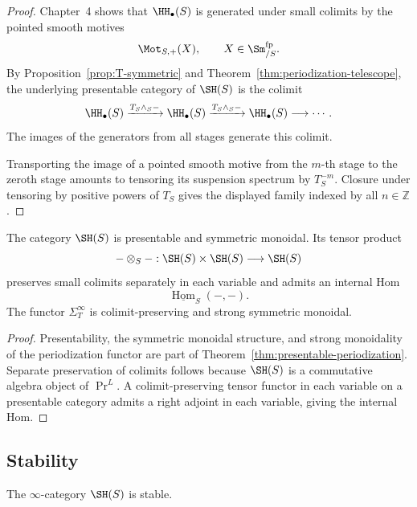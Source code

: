 \begin{proof}
Chapter~4 shows that \(\HH_\bullet(S)\) is generated under small colimits by
the pointed smooth motives
\[
    \Mot_{S,+}(X),
    \qquad
    X\in\Sm^{\mathrm{fp}}_{/S}.
\]
By Proposition~\ref{prop:T-symmetric} and
Theorem~\ref{thm:periodization-telescope}, the underlying presentable category
of \(\SH(S)\) is the colimit
\[
    \HH_\bullet(S)
    \xrightarrow{T_S\wedge_S-}
    \HH_\bullet(S)
    \xrightarrow{T_S\wedge_S-}
    \HH_\bullet(S)
    \longrightarrow\cdots.
\]
The images of the generators from all stages generate this colimit.

Transporting the image of a pointed smooth motive from the \(m\)-th stage to
the zeroth stage amounts to tensoring its suspension spectrum by
\(T_S^{-m}\).  Closure under tensoring by positive powers of \(T_S\) gives
the displayed family indexed by all \(n\in\mathbb Z\).
\end{proof}

\begin{proposition}
\label{prop:SH-presentable-closed}
The category $\SH(S)$ is presentable and symmetric monoidal.  Its tensor product
\[
    -\otimes_S-:\SH(S)\times\SH(S)\longrightarrow\SH(S)
\]
preserves small colimits separately in each variable and admits an internal Hom
\[
    \underline{\operatorname{Hom}}_S(-,-).
\]
The functor $\Sigma_T^\infty$ is colimit-preserving and strong symmetric monoidal.
\end{proposition}

\begin{proof}
Presentability, the symmetric monoidal structure, and strong monoidality of the periodization functor
are part of Theorem~\ref{thm:presentable-periodization}.  Separate preservation of colimits follows
because $\SH(S)$ is a commutative algebra object of $\Pr^L$.  A colimit-preserving tensor functor in
each variable on a presentable category admits a right adjoint in each variable, giving the internal
Hom.
\end{proof}

\subsection{Stability}

\begin{theorem}
\label{thm:SH-stable}
The \(\infty\)-category \(\SH(S)\) is stable.
\end{theorem}

